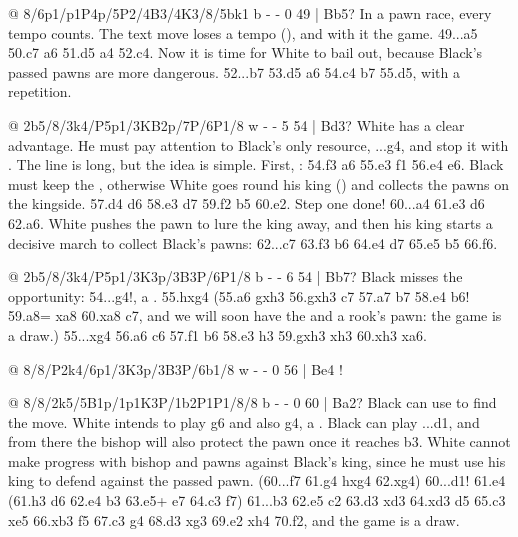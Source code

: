 @ 8/6p1/p1P4p/5P2/4B3/4K3/8/5bk1 b - - 0 49 | Bb5?
In a pawn race, every tempo counts. The text move loses a tempo (), and with it the
game. 49...a5 50.c7 \B a6 51.\B d5 a4 52.\B c4. Now it is
time for White to bail out, because Black's passed pawns are more dangerous. 52...\B b7 53.\B d5
\B a6 54.\B c4 \B b7 55.\B d5, with a repetition.

@ 2b5/8/3k4/P5p1/3KB2p/7P/6P1/8 w - - 5 54 | Bd3?
White has a clear advantage. He must pay attention to Black's only resource, ...g4, and stop it
with . The line is long, but the idea is simple. First,
: 54.\B f3 \B a6 55.\K e3 \B f1 56.\K e4
\K e6. Black must keep the , otherwise
White goes round his king () and collects the pawns on the
kingside. 57.\K d4 \K d6 58.\K e3 \K d7 59.\K f2 \B b5
60.\B e2. Step one done! 60...\B a4 61.\K e3 \K d6 62.a6. White pushes the pawn to lure the king
away, and then his king starts a decisive march to collect Black's pawns: 62...\K c7 63.\B f3
\K b6 64.\K e4 \B d7 65.\K e5 \B b5 66.\K f6.

@ 2b5/8/3k4/P5p1/3K3p/3B3P/6P1/8 b - - 6 54 | Bb7?
Black misses the opportunity: 54...g4!, a . 55.hxg4 (55.a6 gxh3 56.gxh3 \K c7 57.a7 \B b7 58.\B e4
\K b6! 59.a8=\Q{} \B xa8 60.\B xa8 \K c7, and we will soon have the  and a rook's
pawn: the game is a draw.)
55...\B xg4 56.a6 \K c6 57.\B f1 \K b6 58.\K e3 h3 59.gxh3 \B xh3 60.\B xh3 \K xa6.

@ 8/8/P2k4/6p1/3K3p/3B3P/6b1/8 w - - 0 56 | Be4
!

@ 8/8/2k5/5B1p/1p1K3P/1b2P1P1/8/8 b - - 0 60 | Ba2?
Black can use  to find the move. White intends to play
\B g6 and also g4, a . Black can play
...\B d1, and from there the bishop will also protect the pawn once it reaches b3. White cannot make progress with bishop and
pawns against Black's king, since he must use his king to defend against the passed pawn.
(60...\B f7 61.g4 hxg4 62.\B xg4) 60...\B d1! 61.e4 (61.\B h3 \K d6 62.e4 b3 63.e5+ \K e7 64.\K c3
\K f7) 61...b3 62.e5 \B c2 63.\B d3 \B xd3 64.\K xd3 \K d5 65.\K c3 \K xe5 66.\K xb3 \K f5
67.\K c3 \K g4 68.\K d3 \K xg3 69.\K e2 \K xh4 70.\K f2, and the game is a draw.

